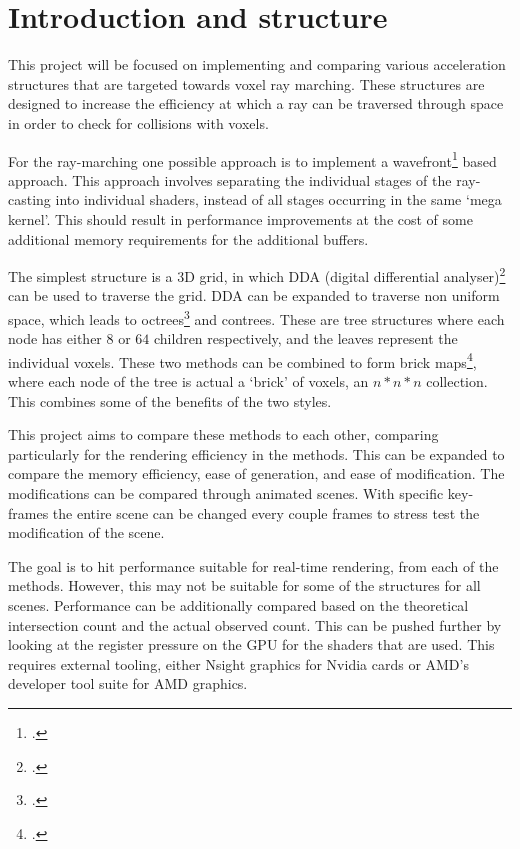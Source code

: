 \section*{Introduction and structure}

This project will be focused on implementing and comparing various
acceleration structures that are targeted towards voxel ray marching.
These structures are designed to increase the efficiency at which a
ray can be traversed through space in order to check for collisions with
voxels.

For the ray-marching one possible approach is to implement a
wavefront\footcite{laine2013wavefront} based approach. This approach
involves separating the individual stages of the ray-casting into individual
shaders, instead of all stages occurring in the same `mega kernel'. This should
result in performance improvements at the cost of some additional
memory requirements for the additional buffers.

The simplest structure is a 3D grid, in which DDA (digital
differential analyser)\footcite{amanatides1987fast} can be used to
traverse the grid. DDA can be expanded to traverse non uniform space,
which leads to octrees\footcite{laine2010svo} and contrees. These are
tree structures where each node has either $8$ or $64$ children
respectively, and the leaves represent the individual voxels. These
two methods can be combined to form brick
maps\footcite{van2015brickmap}, where each node of the tree is actual
a `brick' of voxels, an $n*n*n$ collection. This combines some of the
benefits of the two styles.

This project aims to compare these methods to each other, comparing
particularly for the rendering efficiency in the methods. This
can be expanded to compare the memory efficiency, ease of generation,
and ease of modification. The modifications can be compared through
animated scenes. With specific key-frames the entire scene can be changed every
couple frames to stress test the modification of the scene.

The goal is to hit performance suitable for real-time rendering, from each
of the methods. However, this may not be suitable for some of the structures
for all scenes.
Performance can be additionally compared based on the theoretical
intersection count and the actual observed count. This can be
pushed further by looking at the register pressure on the GPU for
the shaders that are used. This requires external tooling, either
Nsight graphics for Nvidia cards or AMD's developer tool suite
for AMD graphics.

